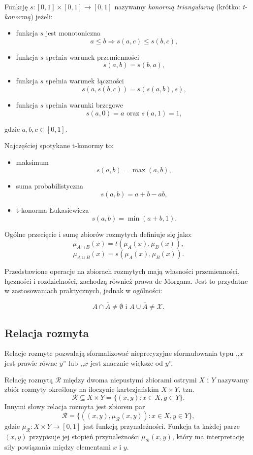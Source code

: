 \begin{definition}[t-konorma]
Funkcję $s : [0,1] \times [0,1] \rightarrow [0,1]$ nazywamy \emph{konormą
triangularną} (krótko: \emph{t-konormą}) jeżeli:
\begin{itemize}
  \item funkcja $s$ jest monotoniczna $$a \leq b \Rightarrow s(a,c) \leq
  s(b,c),$$
  \item funkcja $s$ spełnia warunek przemienności $$s(a,b) = s(b,a),$$
  \item funkcja $s$ spełnia warunek łączności $$s(a, s(b,c)) = s(s(a,b),s),$$
  \item funkcja $s$ spełnia warunki brzegowe $$s(a,0)=a \textrm{ oraz }
  s(a,1)=1,$$
\end{itemize}
gdzie $a, b, c \in [0,1]$.
\end{definition}

Najczęściej spotykane t-konormy to:
\begin{itemize}
  \item maksimum $$s(a,b) = \max(a,b),$$
  \item suma probabilistyczna $$s(a,b) = a+b-ab,$$
  \item t-konorma Łukasiewicza $$s(a,b) = \min(a+b,1).$$
\end{itemize}

Ogólne przecięcie i sumę zbiorów rozmytych definiuje się jako:
$$\mu_{A \cap B}(x) = t(\mu_A(x), \mu_B(x)), $$
$$\mu_{A \cup B}(x) = s(\mu_A(x), \mu_B(x)). $$

Przedstawione operacje na zbiorach rozmytych mają własności przemienności,
łączności i rozdzielności, zachodzą również prawa de Morgana. Jest to przydatne
w zastosowaniach praktycznych, jednak w ogólności:

$$A \cap \bar{A} \neq \emptyset \textrm{ i } A \cup \bar{A} \neq \mathcal{X}.$$

\subsection{Relacja rozmyta}
Relacje rozmyte pozwalają sformalizować nieprecyzyjne sformułowania typu ,,$x$
jest prawie równe $y$'' lub ,,$x$ jest znacznie większe od $y$''.

\begin{definition}
Relację rozmytą $\mathcal{R}$ między dwoma niepustymi zbiorami ostrymi $X$ i $Y$
nazywamy zbiór rozmyty określony na iloczynie kartezjańskim $X \times Y$, tzn.
$$\mathcal{R} \subseteq X \times Y = \{ (x,y) : x \in X, y \in Y \}.$$
Innymi słowy relacja rozmyta jest zbiorem par
\begin{equation}
\mathcal{R} = \{ ((x,y), \mu_{\mathcal{R}}(x,y)) : x \in X, y \in Y \},
\end{equation}
gdzie $\mu_{\mathcal{R}} : X \times Y \rightarrow [0,1]$ jest funkcją
przynależności. Funkcja ta każdej parze $(x,y)$ przypisuje jej stopień
przynależności $\mu_{\mathcal{R}}(x,y)$, który ma interpretację siły powiązania
między elementami $x$ i $y$.
\end{definition}


